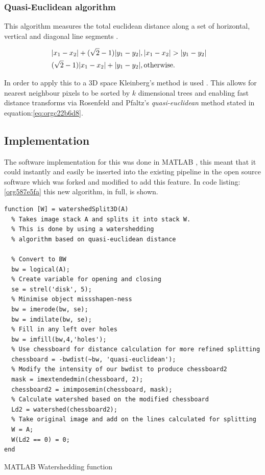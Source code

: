 \documentclass[11pt]{report}
\begin{document}
\subsubsection{Quasi-Euclidean algorithm}
\label{sec:org2c511ef}

This algorithm measures the total euclidean distance along a set of horizontal, vertical and diagonal
line segments \cite{Pfaltz1966}.

\begin{align}
\label{eq:orgc22b6d8}
  &\begin{aligned}
&|x_1-x_2|+(\sqrt{2}-1)|y_1-y_2|, |x_1-x_2| > |y_1-y_2| \\
      &(\sqrt{2}-1)|x_1-x_2| + |y_1-y_2|, \textup{otherwise.}
  \end{aligned}
\end{align}

In order to apply this to a 3D space Kleinberg's method is used  \cite{Kleinberg1997}. This allows for nearest neighbour pixels to be sorted by \(k\) dimensional trees
and enabling fast distance transforms via Rosenfeld and Pfaltz's \emph{quasi-euclidean} method stated in equation:\ref{eq:orgc22b6d8}.

\subsection{Implementation}
\label{sec:org6f8358b}

The software implementation for this was done in MATLAB \cite{MATHWORKS2017}, this meant that it could instantly and easily be inserted into the existing pipeline in the open source software which was forked and modified to add this feature. In code listing:\ref{org587e5fa} this new algorithm, in full, is shown.

\begin{listing}[htbp]
\begin{verbatim}
function [W] = watershedSplit3D(A)
  % Takes image stack A and splits it into stack W.
  % This is done by using a watershedding
  % algorithm based on quasi-euclidean distance

  % Convert to BW
  bw = logical(A);
  % Create variable for opening and closing
  se = strel('disk', 5);
  % Minimise object missshapen-ness
  bw = imerode(bw, se);
  bw = imdilate(bw, se);
  % Fill in any left over holes
  bw = imfill(bw,4,'holes');
  % Use chessboard for distance calculation for more refined splitting
  chessboard = -bwdist(~bw, 'quasi-euclidean');
  % Modify the intensity of our bwdist to produce chessboard2
  mask = imextendedmin(chessboard, 2);
  chessboard2 = imimposemin(chessboard, mask);
  % Calculate watershed based on the modified chessboard
  Ld2 = watershed(chessboard2);
  % Take original image and add on the lines calculated for splitting
  W = A;
  W(Ld2 == 0) = 0;
end
\end{verbatim}
\caption{\label{org587e5fa}
MATLAB Watershedding function}
\end{listing}
\end{document}
